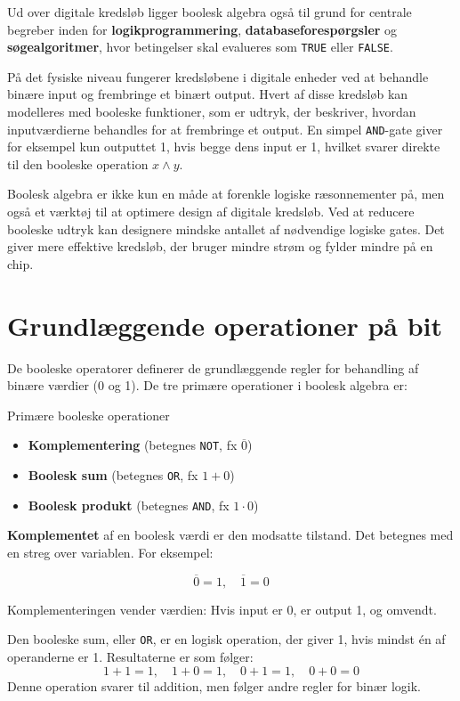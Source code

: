 Ud over digitale kredsløb ligger boolesk algebra også til grund for centrale begreber inden for \textbf{logikprogrammering}, \textbf{databaseforespørgsler} og \textbf{søgealgoritmer}, hvor betingelser skal evalueres som \texttt{TRUE} eller \texttt{FALSE}.

På det fysiske niveau fungerer kredsløbene i digitale enheder ved at behandle binære input og frembringe et binært output. Hvert af disse kredsløb kan modelleres med booleske funktioner, som er udtryk, der beskriver, hvordan inputværdierne behandles for at frembringe et output. En simpel \texttt{AND}-gate giver for eksempel kun outputtet 1, hvis begge dens input er 1, hvilket svarer direkte til den booleske operation \( x \land y \).

Boolesk algebra er ikke kun en måde at forenkle logiske ræsonnementer på, men også et værktøj til at optimere design af digitale kredsløb. Ved at reducere booleske udtryk kan designere mindske antallet af nødvendige logiske gates. Det giver mere effektive kredsløb, der bruger mindre strøm og fylder mindre på en chip.

\section{Grundlæggende operationer på bit}
De booleske operatorer definerer de grundlæggende regler for behandling af binære værdier (0 og 1). De tre primære operationer i boolesk algebra er:

\begin{custombox}{Primære booleske operationer}
    

\begin{itemize}
    \item \textbf{Komplementering} (betegnes \texttt{NOT}, fx $\overline{0}$)
    \item \textbf{Boolesk sum} (betegnes \texttt{OR}, fx $1 + 0$)
    \item \textbf{Boolesk produkt} (betegnes \texttt{AND}, fx $1 \cdot 0$)
\end{itemize}
\end{custombox}

\textbf{Komplementet} af en boolesk værdi er den modsatte tilstand. Det betegnes med en streg over variablen. For eksempel:

\[
\overline{0} = 1, \quad \overline{1} = 0
\]

Komplementeringen vender værdien: Hvis input er 0, er output 1, og omvendt.

Den booleske sum, eller \texttt{OR}, er en logisk operation, der giver 1, hvis mindst én af operanderne er 1. Resultaterne er som følger:
\[
1 + 1 = 1, \quad 1 + 0 = 1, \quad 0 + 1 = 1, \quad 0 + 0 = 0
\]
Denne operation svarer til addition, men følger andre regler for binær logik.

